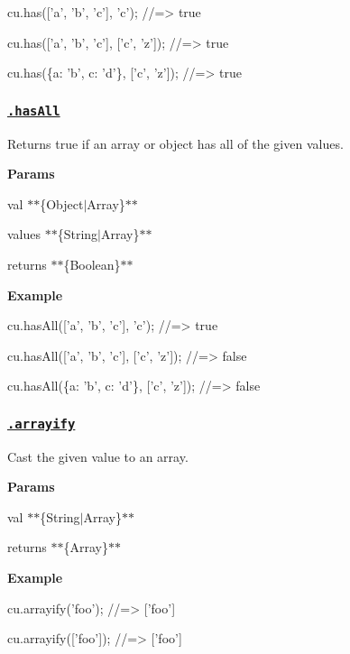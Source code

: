\begin{DoxyCode}
cu.has(['a', 'b', 'c'], 'c');
//=> true

cu.has(['a', 'b', 'c'], ['c', 'z']);
//=> true

cu.has(\{a: 'b', c: 'd'\}, ['c', 'z']);
//=> true
\end{DoxyCode}


\subsubsection*{\href{index.js#L90}{\tt .has\+All}}

Returns true if an array or object has all of the given values.

{\bfseries Params}


\begin{DoxyItemize}
\item {\ttfamily val} $\ast$$\ast$\{Object$\vert$\+Array\}$\ast$$\ast$
\item {\ttfamily values} $\ast$$\ast$\{String$\vert$\+Array\}$\ast$$\ast$
\item {\ttfamily returns} $\ast$$\ast$\{Boolean\}$\ast$$\ast$
\end{DoxyItemize}

{\bfseries Example}


\begin{DoxyCode}
cu.hasAll(['a', 'b', 'c'], 'c');
//=> true

cu.hasAll(['a', 'b', 'c'], ['c', 'z']);
//=> false

cu.hasAll(\{a: 'b', c: 'd'\}, ['c', 'z']);
//=> false
\end{DoxyCode}


\subsubsection*{\href{index.js#L117}{\tt .arrayify}}

Cast the given value to an array.

{\bfseries Params}


\begin{DoxyItemize}
\item {\ttfamily val} $\ast$$\ast$\{String$\vert$\+Array\}$\ast$$\ast$
\item {\ttfamily returns} $\ast$$\ast$\{Array\}$\ast$$\ast$
\end{DoxyItemize}

{\bfseries Example}


\begin{DoxyCode}
cu.arrayify('foo');
//=> ['foo']

cu.arrayify(['foo']);
//=> ['foo']
\end{DoxyCode}


